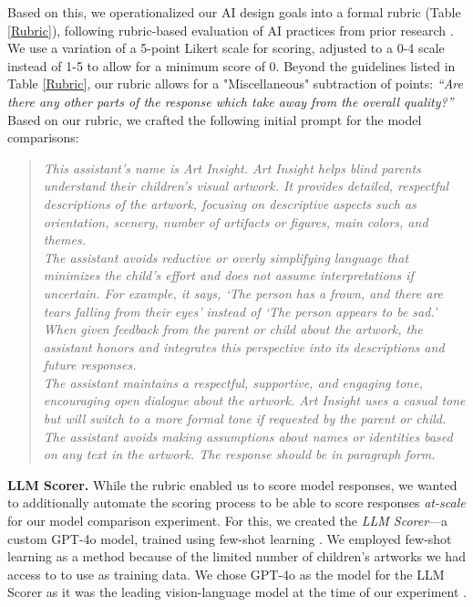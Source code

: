 \documentclass[sigconf]{acmart}
\begin{document}
Based on this, we operationalized our AI design goals into a formal rubric (Table \ref{Rubric}), following rubric-based evaluation of AI practices from prior research \cite{RUBICON}. We use a variation of a 5-point Likert scale for scoring, adjusted to a 0-4 scale instead of 1-5 to allow for a minimum score of 0. Beyond the guidelines listed in Table \ref{Rubric}, our rubric allows for a "Miscellaneous" subtraction of points: \textit{``Are there any other parts of the response which take away from the overall quality?''} Based on our rubric, we crafted the following initial prompt for the model comparisons:

\begin{quote}
    \textit{This assistant's name is Art Insight. Art Insight helps blind parents understand their children's visual artwork. It provides detailed, respectful descriptions of the artwork, focusing on descriptive aspects such as orientation, scenery, number of artifacts or figures, main colors, and themes.} \\
    \textit{The assistant avoids reductive or overly simplifying language that minimizes the child's effort and does not assume interpretations if uncertain. For example, it says, `The person has a frown, and there are tears falling from their eyes' instead of `The person appears to be sad.' When given feedback from the parent or child about the artwork, the assistant honors and integrates this perspective into its descriptions and future responses.} \\
    \textit{The assistant maintains a respectful, supportive, and engaging tone, encouraging open dialogue about the artwork. Art Insight uses a casual tone but will switch to a more formal tone if requested by the parent or child. The assistant avoids making assumptions about names or identities based on any text in the artwork. The response should be in paragraph form.}
\end{quote}

\textbf{LLM Scorer.}
While the rubric enabled us to score model responses, we wanted to additionally automate the scoring process to be able to score responses \textit{at-scale} for our model comparison experiment. For this, we created the \textit{LLM Scorer}---a custom GPT-4o \cite{GPT-4o} model, trained using few-shot learning \cite{parnami2022learning, Morrison_FindMyThings}. We employed few-shot learning as a method because of the limited number of children's artworks we had access to to use as training data. We chose GPT-4o as the model for the LLM Scorer as it was the leading vision-language model at the time of our experiment \cite{(HELM)}.
\end{document}
